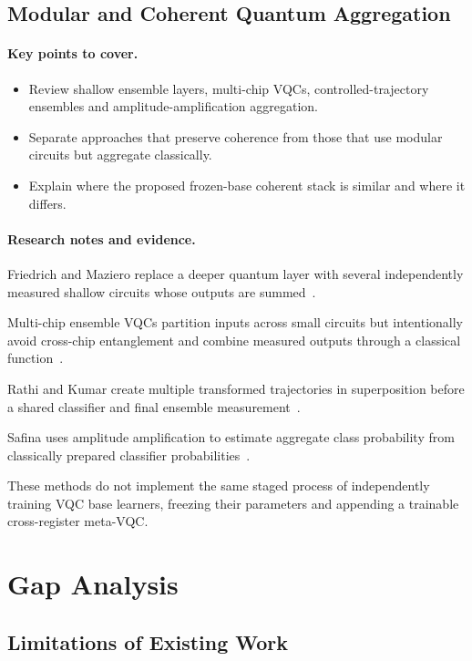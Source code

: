 \documentclass[]{UCD_CS_MSc_AAI_Report}
\newcommand{\method}[1]{{\color{cyan!80!black}#1}}
\newcommand{\gap}[1]{{\color{black}#1}}
\newcommand{\sectionbrief}{\paragraph{Key points to cover.}}
\newcommand{\researchnotes}{\paragraph{Research notes and evidence.}}
\begin{document}
\subsection{Modular and Coherent Quantum Aggregation}

\sectionbrief
\begin{itemize}
    \item Review shallow ensemble layers, multi-chip VQCs, controlled-trajectory ensembles and amplitude-amplification aggregation.
    \item Separate approaches that preserve coherence from those that use modular circuits but aggregate classically.
    \item Explain where the proposed frozen-base coherent stack is similar and where it differs.
\end{itemize}

\researchnotes
\begin{itemize}
    \method{\item Friedrich and Maziero replace a deeper quantum layer with several independently measured shallow circuits whose outputs are summed~\cite{friedrich_quantum_2025}.}
    \method{\item Multi-chip ensemble VQCs partition inputs across small circuits but intentionally avoid cross-chip entanglement and combine measured outputs through a classical function~\cite{park_addressing_2025}.}
    \method{\item Rathi and Kumar create multiple transformed trajectories in superposition before a shared classifier and final ensemble measurement~\cite{rathi_enhanced_2025}.}
    \method{\item Safina uses amplitude amplification to estimate aggregate class probability from classically prepared classifier probabilities~\cite{safina_quantum_2023}.}
    \gap{\item These methods do not implement the same staged process of independently training VQC base learners, freezing their parameters and appending a trainable cross-register meta-VQC.}
\end{itemize}

\section{Gap Analysis}
\label{sec:rw-gap}

\subsection{Limitations of Existing Work}
\end{document}
